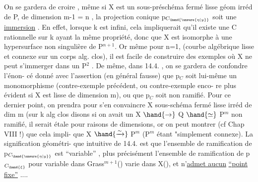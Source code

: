 On se gardera de croire , même si X est un sous-préschéma fermé
lisse géom irréd de P, de dimension m-1 = n ,  la projection conique p$_{C_{\hand{\unsure{\eta|y}}}}$
soit  une \uline{immersion} . En effet, lorsque k est infini, cela impliquerait
qu'il existe une C rationnelle sur k ayant la même propriété, donc que X
est isomorphe à une hypersurface non singulière de  P$^{n+1}$. Or
même pour n=1, (courbe algébrique  lisse  et connexe sur un corps alg.
clos), il est facile de construire des exemples où X ne peut s'immerger
dans un P$^2$ . De même, dans 14.4. , on se gardera de confondre l'énon-%
cé donné avec l'assertion (en général fausse) que p$_C$ soit lui-même un
monomorphisme (contre-exemple précédent, ou contre-exemple enco-%
re plus évident si X est lisse de dimension m), ou que p$_C$ soit non
ramifié. Pour ce dernier point, on prendra pour s'en convaincre X
sous-schéma fermé lisse  irréd de dim m (sur k alg clos disons
si  on avait un X $\hand{\to}$ Q $\hand{\simeq}$ P$^m$ non ramifié, il serait étale pour
raisons de dimensions, or on peut montrer (cf Chap VIII !) que cela impli-%
que X $\hand{\xrightarrow{\sim}}$ P$^m$ (P$^m$ étant "simplement connexe). \hand{--} La signification géométri-%
que intuitive de 14.4. est que l'ensemble de
ramification de p$_{C_{\hand{\unsure{\eta|y}}}}$ est ``variable'' , plus précisément l'ensemble de
ramification de p$_{C_{\hand{\xi}}}$ pour \hand{\xi} variable dans  Grass$^{m+1}$() varie dans X(), et
n'\uline{admet aucun}  \uline{``point fixe''} ....

